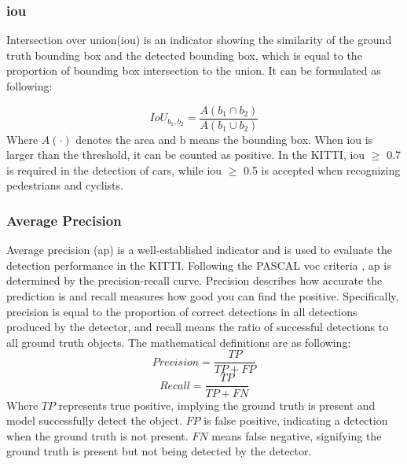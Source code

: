 \subsubsection{\acrshort{iou}}
Intersection over union(\acrshort{iou}) is an indicator showing the similarity of the ground truth bounding box and the detected bounding box, which is equal to the proportion of bounding box intersection to the union. It can be formulated as following:

\begin{equation}
          IoU_{b_{1},b_{2}} = \frac{A(b_{1}\cap b_{2})}{A(b_{1}\cup b_{2})} 
\end{equation}
Where \(A(\cdot)\) denotes the area and b means the bounding box. When \acrshort{iou} is larger than the threshold, it can be counted as positive. In the KITTI, \acrshort{iou} \(\geq\) 0.7 is required in the detection of cars, while \acrshort{iou} \(\geq\) 0.5 is accepted when recognizing pedestrians and cyclists.

\subsubsection{Average Precision}
Average precision (\acrshort{ap}) is a well-established indicator and is used to evaluate the detection performance in the KITTI. Following the PASCAL \acrshort{voc} criteria \cite{everingham_pascal_2010}, \acrshort{ap} is determined by the precision-recall curve. Precision describes how accurate the prediction is and recall measures how good you can find the positive. Specifically, precision is equal to the proportion of correct detections in all detections produced by the detector, and recall means the ratio of successful detections to all ground truth objects. The mathematical definitions are as following:
\begin{equation}
\label{precision}
          Precision = \frac{TP}{TP+FP}
\end{equation}
\begin{equation}
\label{recall}
          Recall = \frac{TP}{TP+FN} 
\end{equation}
Where \(TP\) represents true positive, implying the ground truth is present and model successfully detect the object. \(FP\) is false positive, indicating a detection when the ground truth is not present. \(FN\) means false negative, signifying the ground truth is present but not being detected by the detector.

